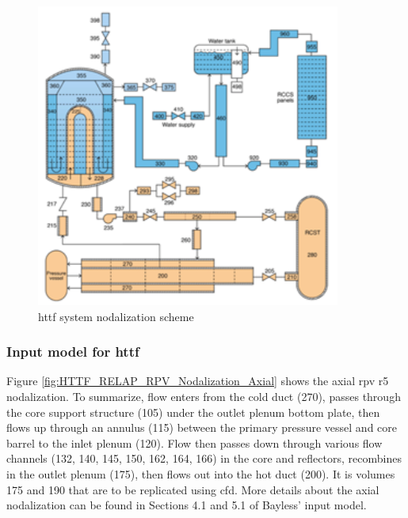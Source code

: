 \documentclass[double,12pt]{beavtex}
\begin{document}
\begin{figure}
    \begin{center}
    	\includegraphics[width=10cm]{Figures/HTTF_RELAP_Nodalization.png}
    	\caption{\acrshort{httf} system nodalization scheme }
    	\label{fig:HTTF_RELAP_Nodalization}
    	\end{center}
\end{figure}

\subsubsection{Input model for \acrshort{httf}}

Figure \ref{fig:HTTF_RELAP_RPV_Nodalization_Axial} shows the axial \acrshort{rpv} \acrshort{r5} nodalization. To summarize, flow enters from the cold duct (270), passes through the core support structure (105) under the outlet plenum bottom plate, then flows up through an annulus (115) between the primary pressure vessel and core barrel to the inlet plenum (120). Flow then passes down through various flow channels (132, 140, 145, 150, 162, 164, 166) in the core and reflectors, recombines in the outlet plenum (175), then flows out into the hot duct (200). It is volumes 175 and 190 that are to be replicated using \acrshort{cfd}. More details about the axial nodalization can be found in Sections 4.1 and 5.1 of Bayless’ input model.
\end{document}
